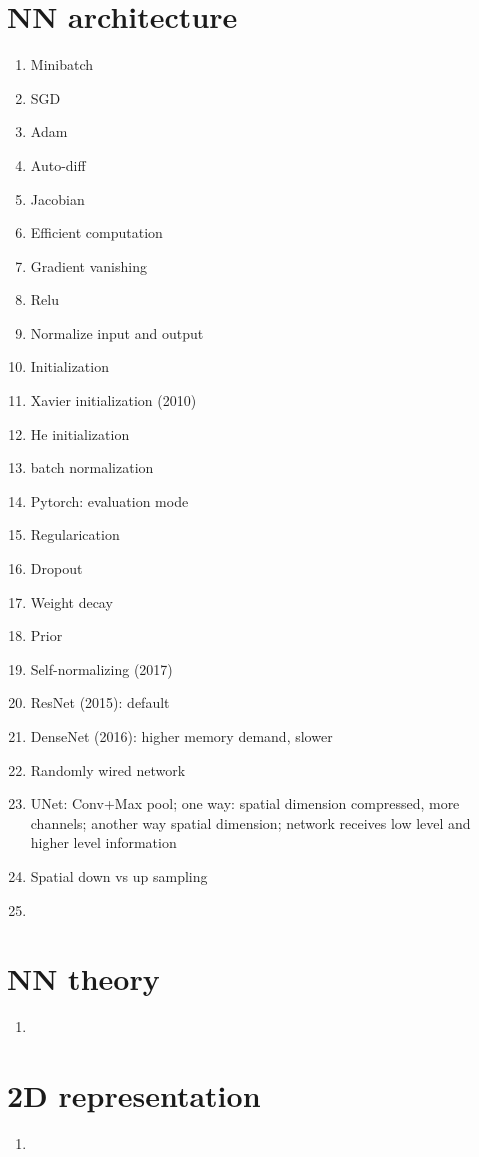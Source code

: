 \documentclass{article}
\begin{document}
	\section{NN architecture}
	\begin{enumerate}
		\item Minibatch
		\item SGD
		\item Adam
		\item Auto-diff
		\item Jacobian
		\item Efficient computation
		\item Gradient vanishing
		\item Relu
		\item Normalize input and output
		\item Initialization
		\item Xavier initialization (2010)
		\item He initialization
		\item batch normalization
		\item Pytorch: evaluation mode
		\item Regularication
		\item Dropout
		\item Weight decay 
		\item Prior
		\item Self-normalizing (2017)
		\item ResNet (2015): default
		\item DenseNet (2016): higher memory demand, slower
		\item Randomly wired network
		\item UNet: Conv+Max pool; one way: spatial dimension compressed, more channels; another way spatial dimension; network receives low level and higher level information
		\item Spatial down vs up sampling
		\item 
	\end{enumerate}
	\section{NN theory}
	\begin{enumerate}
		\item 
	\end{enumerate}
	\section{2D representation}
	\begin{enumerate}
		\item 
	\end{enumerate}
\end{document}
